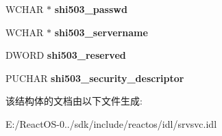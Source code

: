 \begin{DoxyCompactItemize}
\mbox{\label{struct___s_h_a_r_e___i_n_f_o__503___i_a6dee04f0fa5e5f6392bedb797adb6797}} 
W\+C\+H\+AR $\ast$ {\bfseries shi503\+\_\+passwd}
\item 
\mbox{\label{struct___s_h_a_r_e___i_n_f_o__503___i_ac0e3264bfdfca2789abfba415348f30c}} 
W\+C\+H\+AR $\ast$ {\bfseries shi503\+\_\+servername}
\item 
\mbox{\label{struct___s_h_a_r_e___i_n_f_o__503___i_a87a810b216b9d0aadac5e68b709bb478}} 
D\+W\+O\+RD {\bfseries shi503\+\_\+reserved}
\item 
\mbox{\label{struct___s_h_a_r_e___i_n_f_o__503___i_a46297ef4ce451be731aaa85e5a50a9c4}} 
P\+U\+C\+H\+AR {\bfseries shi503\+\_\+security\+\_\+descriptor}
\end{DoxyCompactItemize}


该结构体的文档由以下文件生成\+:\begin{DoxyCompactItemize}
\item 
E\+:/\+React\+O\+S-\/0../sdk/include/reactos/idl/srvsvc.\+idl\end{DoxyCompactItemize}
